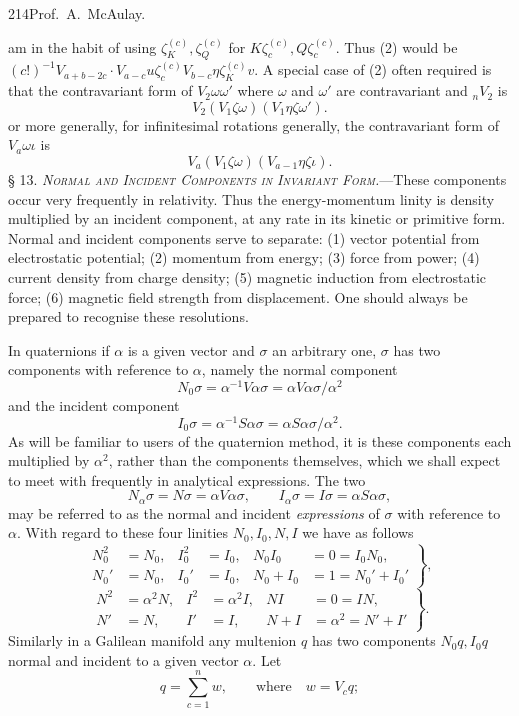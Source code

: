 \documentclass[11pt]{article}
\begin{document}
\newpage\thispagestyle{empty}\begin{center}214\hfill Prof.\ A.\ McAulay.\end{center}
am in the habit of using $\zeta_K^{(c)},\zeta_Q^{(c)}$ for $K\zeta_c^{(c)},Q\zeta_c^{(c)}$. Thus (2) would be $(c!)^{-1}V_{a+b-2c}\cdot V_{a-c}u\zeta_c^{(c)}V_{b-c}\eta\zeta_K^{(c)}v$. A special case of (2) often required is that the contravariant form of $V_2\omega\omega'$ where $\omega$ and $\omega'$ are contravariant and ${}_nV_2$ is
\begin{equation}V_2(V_1\zeta\omega)(V_1\eta\zeta\omega').\tag{3}\end{equation}
or more generally, for infinitesimal rotations generally, the contravariant form of $V_a\omega\iota$ is
\begin{equation}V_a(V_1\zeta\omega)(V_{a-1}\eta\zeta\iota).\tag{4}\end{equation}
\noindent\textsc{§ 13. \emph{Normal and Incident Components in Invariant Form.}}---These components occur very frequently in relativity. Thus the energy-momentum linity is density multiplied by an incident component, at any rate in its kinetic or primitive form. Normal and incident components serve to separate: (1) vector potential from electrostatic potential; (2) momentum from energy; (3) force from power; (4) current density from charge density; (5) magnetic induction from electrostatic force; (6) magnetic field strength from displacement. One should always be prepared to recognise these resolutions.

\indent In quaternions if $\alpha$ is a given vector and $\sigma$ an arbitrary one, $\sigma$ has two components with reference to $\alpha$, namely the normal component
\[
N_0\sigma=\alpha^{-1}V\alpha\sigma=\alpha V\alpha\sigma/\alpha^2
\]
and the incident component
\[
I_0\sigma=\alpha^{-1}S\alpha\sigma=\alpha S\alpha\sigma/\alpha^2.
\]
As will be familiar to users of the quaternion method, it is these components each multiplied by $\alpha^2$, rather than the components themselves, which we shall expect to meet with frequently in analytical expressions. The two
\[
N_\alpha\sigma=N\sigma=\alpha V\alpha\sigma,\qquad I_\alpha\sigma=I\sigma=\alpha S\alpha\sigma,
\]
may be referred to as the normal and incident \emph{expressions} of $\sigma$ with reference to $\alpha$. With regard to these four linities $N_0,I_0,N,I$ we have as follows
\begin{equation}\left.\begin{aligned}N_0^2&=N_0,&I_0^2&=I_0,&N_0I_0&=0=I_0N_0,\\N_0'&=N_0,&I_0'&=I_0,&N_0+I_0&=1=N_0'+I_0'\end{aligned}\right\},\tag{1}\end{equation}
\begin{equation}\left.\begin{aligned}N^2&=\alpha^2N,&I^2&=\alpha^2I,&NI&=0=IN,\\N'&=N,&I'&=I,&N+I&=\alpha^2=N'+I'\end{aligned}\right\}.\tag{2}\end{equation}
Similarly in a Galilean manifold any multenion $q$ has two components $N_0q,I_0q$ normal and incident to a given vector $\alpha$. Let
\[
q=\sum_{c=1}^n w,\qquad\text{where}\quad w=V_cq;
\]
\end{document}
